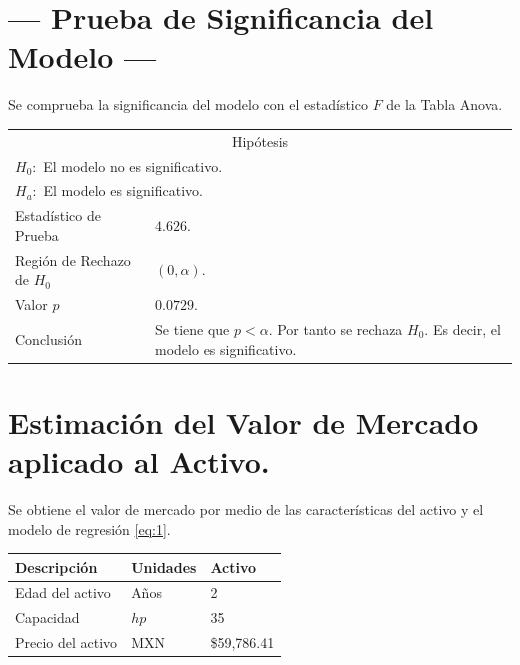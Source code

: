\documentclass{article}
\begin{document}
\section{\centering --- Prueba de Significancia del Modelo ---} %
Se comprueba la significancia del modelo con el estadístico \(F\) de la Tabla Anova.
\begin{center}
  \begin{tabular}{|l|p{6cm}|}
    \cline{1-2}
    \multicolumn{2}{|c|}{Hipótesis}\\ \cline{1-2}
    \multicolumn{2}{|l|}{\(H_0:\) El modelo no es significativo.} \\ 
    \multicolumn{2}{|l|}{\(H_a:\) El modelo es significativo.} \\ \cline{1-2}
    Estadístico de Prueba & \(4.626\).\\ \cline{1-2} 
		Región de Rechazo de \(H_0\) & \((0, \alpha )\).\\ \cline{1-2} 
    Valor \(p\) & \(0.0729\).\\ \cline{1-2} 
    Conclusión & Se tiene que \(p<\alpha\). \newline 
		Por tanto se rechaza \(H_0\). \newline 
		Es decir, el modelo es significativo.\\ \cline{1-2} 
  \end{tabular}
\end{center} 

\section{\centering Estimación del Valor de Mercado aplicado al Activo.} %
Se obtiene el valor de mercado por medio de las características del activo y el modelo de regresión \eqref{eq:1}.
\begin{center}
  \begin{tabular}{|l|l|l|}
    \hline 
		Descripción   & Unidades  & Activo \\ \hline 
    Edad del activo    & Años      & 2      \\ \hline 
		Capacidad  & \(hp\) & 35   \\ \hline 
		Precio del activo   & MXN       & \$59,786.41   \\ \hline 
  \end{tabular}
\end{center} 
\end{document}
